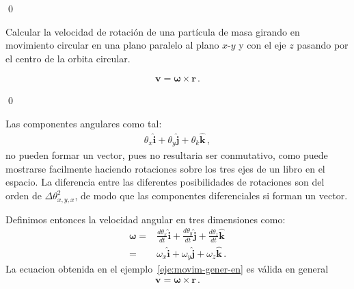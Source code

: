\qed



\ejemplo{} 
\label{eje:movim-gener-en}
Calcular la velocidad de rotación de una partícula de masa
girando en movimiento circular en una plano paralelo al plano $x$-$y$
y con el eje $z$ pasando por el centro de la orbita circular.


\begin{align*}
  \mathbf{v}=\boldsymbol{\omega}\times\mathbf{r}\,.
\end{align*}

\qed


Las componentes angulares como tal:
\begin{align*}
  \theta_x\hat{\mathbf{i}}+\theta_y\hat{\mathbf{j}}+\theta_k\hat{\mathbf{k}}\,,
\end{align*}
no pueden formar un vector, pues no resultaria ser conmutativo, como
puede mostrarse facilmente haciendo rotaciones sobre los tres ejes de
un libro en el espacio. La diferencia entre las diferentes
posibilidades de rotaciones son del orden de $\Delta
\theta_{x,y,x}^2$, de modo que las componentes diferenciales si forman
un vector. 

Definimos entonces la velocidad angular en tres dimensiones como:
\begin{align}
  \boldsymbol{\omega}=&\frac{d\theta_x}{dt}\hat{\mathbf{i}}+\frac{d\theta_y}{dt}\hat{\mathbf{j}}
+\frac{d\theta_z}{dt}\hat{\mathbf{k}}\nonumber\\
=&\omega_x\hat{\mathbf{i}}+\omega_y\hat{\mathbf{j}}+\omega_z\hat{\mathbf{k}}\,.
\end{align}
La ecuacion obtenida en el ejemplo~\ref{eje:movim-gener-en} es válida
en general
\begin{align}
  \mathbf{v}=\boldsymbol{\omega}\times\mathbf{r}\,.
\end{align}


